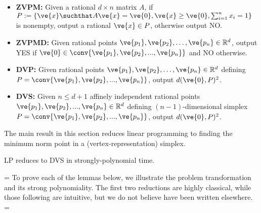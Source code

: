 \begin{definition}
\begin{itemize}
\item
\textbf{\textup{ZVPM:}} 
Given a rational $d \times n$ matrix $A$, if $P:=\{\ve{x} \suchthat A\ve{x} = \ve{0}, \ve{x} \ge \ve{0}, \sum_{i=1}^n x_i = 1\}$ is nonempty, output a rational $\ve{x} \in P$, otherwise output NO.

\item
\textbf{\textup{ZVPMD:}} 
Given rational points $\ve{p_1}, \ve{p_2}, \dotsc,\ve{p_n} \in \mathbb{R}^d$, output YES if $\ve{0} \in \conv\{\ve{p_1},\ve{p_2},...,\ve{p_n}\}$ and NO otherwise.

\item
\textbf{\textup{DVP:}} 
Given rational points $\ve{p_1}, \ve{p_2}, \dotsc,\ve{p_n} \in \mathbb{R}^d$ defining $P = \conv\{\ve{p_1}, \ve{p_2}, ..., \ve{p_n}\}$, output $d(\ve{0},P)^2$.

\fi 

\item
\textbf{\textup{DVS:}} 
Given $n \leq d+1$ affinely independent rational points $\ve{p_1}, \ve{p_2},...,\ve{p_{n}} \in \mathbb{R}^d$ defining $(n-1)$-dimensional simplex $P = \conv\{\ve{p_1}, \ve{p_2}, ..., \ve{p_{n}}\}$, output $d(\ve{0},P)^2$.
\end{itemize}
\end{definition}



The main result in this section reduces linear programming to finding the minimum norm point in a (vertex-representation) simplex.
\begin{theorem}
LP reduces to DVS in strongly-polynomial time.
\end{theorem}
\ifnum\version=\stocversion
\else
To prove each of the lemmas below, we illustrate the problem transformation and its strong polynomiality.  
The first two reductions are highly classical, while those following are intuitive, but we do not believe have been written elsewhere. 
\ifnum\version=\stocversion
\else

